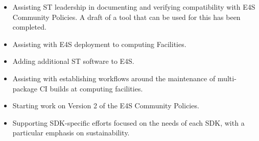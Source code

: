 \begin{itemize}
\item  Assisting ST leadership in documenting and verifying compatibility with E4S Community Policies. A draft of a tool that can be used for this has been completed.
\item  Assisting with E4S deployment to computing Facilities.
\item  Adding additional ST software to E4S.
\item  Assisting with establishing workflows around the maintenance of multi-package CI builds at computing facilities.
\item  Starting work on Version 2 of the E4S Community Policies.
\item  Supporting SDK-specific efforts focused on the needs of each SDK, with a particular emphasis on sustainability.
\end{itemize}

